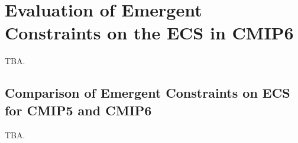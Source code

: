 


\chapter{Evaluation of Emergent Constraints on the \acl{ECS} in \acs{CMIP}6}
\label{ch:05:paper_ecs}

TBA.


\section{Comparison of Emergent Constraints on \acs{ECS} for \acs{CMIP}5 and \acs{CMIP}6}
\label{sec:05:comparison_of_emergent_constraints}

TBA.

